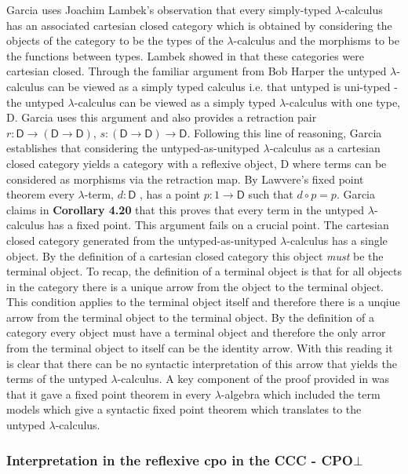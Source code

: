 Garcia uses Joachim Lambek's observation that every simply-typed
$\lambda$-calculus has an associated cartesian closed category which is obtained
by considering the objects of the category to be the types of the
$\lambda$-calculus and the morphisms to be the functions between types. Lambek
showed in  that these categories were cartesian closed. Through the
familiar argument from  Bob Harper the untyped $\lambda$-calculus can
be viewed as a simply typed calculus i.e.  that untyped is uni-typed - the
untyped $\lambda$-calculus can be viewed as a simply typed $\lambda$-calculus
with one type, \textsf{D}. Garcia uses this argument and also provides a
retraction pair $r : \textsf{D} \rightarrow (\textsf{D} \rightarrow
\textsf{D})$, $s : (\textsf{D} \rightarrow \textsf{D}) \rightarrow \textsf{D}$.
Following this line of reasoning, Garcia establishes that considering the
untyped-as-unityped $\lambda$-calculus as a cartesian closed category yields a
category with a reflexive object, \textsf{D} where terms can be considered as
morphisms via the retraction map. By Lawvere's fixed point theorem every
$\lambda$-term, $d : \textsf{D}$ , has a point $p: 1 \rightarrow \textsf{D}$
such that $d \circ p = p$. Garcia claims in \textbf{Corollary 4.20} that this
proves that every term in the untyped $\lambda$-calculus has a fixed point. This argument fails on a crucial point. The cartesian
closed category generated from the untyped-as-unityped $\lambda$-calculus has a
single object. By the definition of a cartesian closed category this object
\textit{must} be the terminal object. To recap, the definition of a terminal
object is that for all objects in the category there is a unique arrow from the
object to the terminal object. This condition applies to the terminal object
itself and therefore there is a unqiue arrow from the terminal object to the
terminal object. By the definition of a category every object must have a
terminal object and therefore the only arror from the terminal object to itself
can be the identity arrow. With this reading it is clear that there can be no
syntactic interpretation of this arrow that yields the terms of the untyped
$\lambda$-calculus. A key component of the proof provided in  was
that it gave a fixed point theorem in every $\lambda$-algebra which included the
term models which give a syntactic fixed point theorem which translates to the
untyped $\lambda$-calculus.

\subsubsection{Interpretation in the reflexive cpo in the CCC -
\textbf{CPO}$\bot$}

